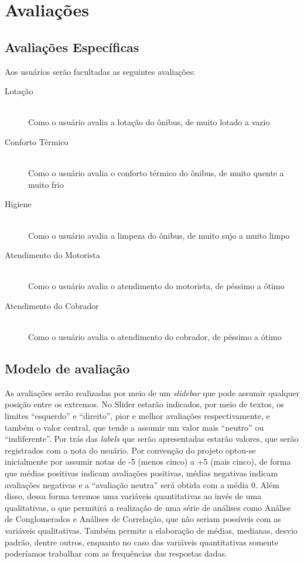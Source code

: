 \section{Avaliações}\label{sec:avalia}
\subsection{Avaliações Específicas}\label{subsec:avaliaspec}
Aos usuários serão facultadas as seguintes avaliações:
\begin{description}
    \item[Lotação] \hfill \\
    Como o usuário avalia a lotação do ônibus, de muito lotado a vazio
    \item[Conforto Térmico] \hfill \\
    Como o usuário avalia o conforto térmico do ônibus, de muito quente a muito frio
    \item[Higiene] \hfill \\
    Como o usuário avalia a limpeza do ônibus, de muito sujo a muito limpo
    \item[Atendimento do Motorista] \hfill \\
    Como o usuário avalia o atendimento do motorista, de péssimo a ótimo
    \item[Atendimento do Cobrador] \hfill \\
    Como o usuário avalia o atendimento do cobrador, de péssimo a ótimo    
\end{description}

\subsection{Modelo de avaliação}\label{subsec:modavalia}
As avaliações serão realizadas por meio de um \textit{slidebar} que pode assumir qualquer posição entre os extremos. No Slider estarão indicados, por meio de textos, os limites ``esquerdo'' e ``direito'', pior e melhor avaliações respectivamente, e também o valor central, que tende a assumir um valor mais ``neutro'' ou ``indiferente''. Por trás das \textit{labels} que serão apresentadas estarão valores, que serão registrados com a nota do usuário. Por convenção do projeto optou-se inicialmente por assumir notas de -5 (menos cinco) a +5 (mais cinco), de forma que médias positivas indicam avaliações positivas, médias negativas indicam avaliações negativas e a ``avaliação neutra'' será obtida com a média 0. Além disso, dessa forma teremos uma variáveis quantitativas ao invés de uma qualitativas, o que permitirá a realização de uma série de análises como Análise de Conglomerados e Análises de Correlação, que não seriam possíveis com as variáveis qualitativas. Também permite a elaboração de médias, medianas, desvio padrão, dentre outros, enquanto no caso das variáveis quantitativas somente poderíamos trabalhar com as frequências das respostas dadas.